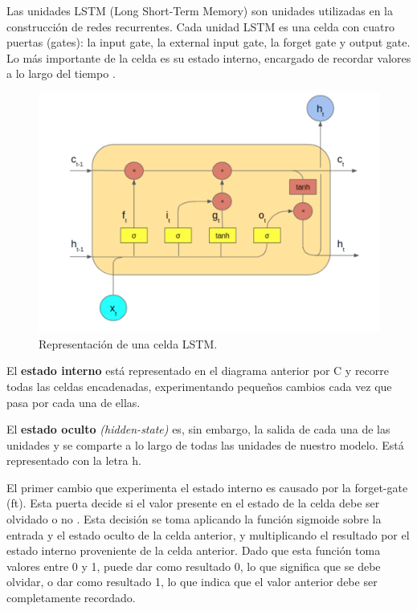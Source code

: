 \vspace{1\baselineskip}
Las unidades LSTM (Long Short-Term Memory) son unidades utilizadas en la construcción de redes recurrentes. Cada unidad LSTM es una celda con cuatro puertas (gates): la input gate, la external input gate, la forget gate y output gate. Lo más importante de la celda es su estado interno, encargado de recordar valores a lo largo del tiempo \cite{roman2018redes}.

\begin{figure}[H]
  \begin{center}
    \includegraphics[scale=0.80]{./lstm_grafico.png}
    \caption{Representación de una celda LSTM.}
    \label{fig:lstm_grafico}
  \end{center}
\end{figure}


El \textbf{estado interno} está representado en el diagrama anterior por C y
recorre todas las celdas encadenadas, experimentando pequeños cambios cada vez
que pasa por cada una de ellas.

\vspace{1\baselineskip}
El \textbf{estado oculto} \textit{(hidden-state)} es, sin embargo, la salida de
cada una de las unidades y se comparte a lo largo de todas las unidades de
nuestro modelo. Está representado con la letra h.

\vspace{1\baselineskip}
El primer cambio que experimenta el estado interno es causado por la
forget-gate (ft). Esta puerta decide si el valor presente en el estado de la
celda debe ser olvidado o no \cite{roman2018redes}. Esta decisión se toma
aplicando la función sigmoide sobre la entrada y el estado oculto de la celda
anterior, y multiplicando el resultado por el estado interno proveniente de la
celda anterior. Dado que esta función toma valores entre 0 y 1, puede dar como
resultado 0, lo que significa que se debe olvidar, o dar como resultado 1, lo
que indica que el valor anterior debe ser completamente recordado.


